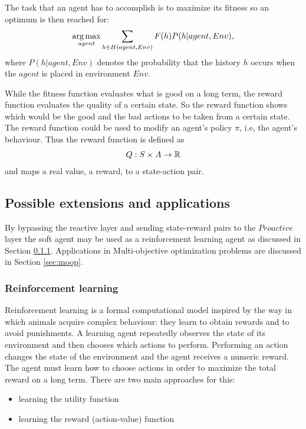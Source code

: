 The task that an agent has to accomplish is to maximize its fitness so an optimum is then reached for:
\begin{align}
\operatorname*{arg\,max}_{agent} \sum_{h \in H(agent, Env)} F(h) P (h | agent, Env),
\end{align}
where $P (h | agent, Env)$ denotes the probability that the history $h$ occurs when the $agent$ is placed in environment $Env$.

While the fitness function evaluates what is good on a long term, the reward function evaluates the quality of a certain state. So the reward function shows which would be the good and the bad actions to be taken from a certain state. The reward function could be used to modify an agent's policy $\pi$, i.e, the agent's behaviour. Thus the reward function is defined as
\begin{align}
Q: S \times A \rightarrow \mathbb R
\end{align}
and maps a real value, a reward, to a state-action pair.

\subsection{Possible extensions and applications}

By bypassing the reactive layer and sending state-reward pairs to the $Proactive$ layer the soft agent may be used as a reinforcement learning agent as discussed in Section \ref{sec:rl}. Applications in Multi-objective optimization problems are discussed in Section \ref{sec:moop}.


\subsubsection{Reinforcement learning}
\label{sec:rl}

Reinforcement learning is a formal computational model inspired by the way in which animals acquire complex behaviour: they learn to obtain rewards and to avoid punishments. A learning agent repeatedly observes the state of its environment and then chooses which actions to perform. Performing an action changes the state of the environment and the agent receives a numeric reward. The agent must learn how to choose actions in order to maximize the total reward on a long term. There are two main approaches for this: 
\begin{itemize}
\item
	learning the utility function
	\item
	learning the reward (action-value) function
\end{itemize}

